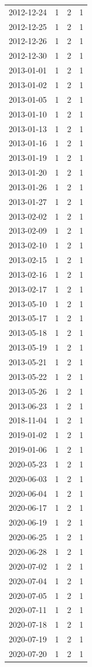\begin{tabular}{lrrr}
2012-12-24 & 1 & 2 & 1 \\
2012-12-25 & 1 & 2 & 1 \\
2012-12-26 & 1 & 2 & 1 \\
2012-12-30 & 1 & 2 & 1 \\
2013-01-01 & 1 & 2 & 1 \\
2013-01-02 & 1 & 2 & 1 \\
2013-01-05 & 1 & 2 & 1 \\
2013-01-10 & 1 & 2 & 1 \\
2013-01-13 & 1 & 2 & 1 \\
2013-01-16 & 1 & 2 & 1 \\
2013-01-19 & 1 & 2 & 1 \\
2013-01-20 & 1 & 2 & 1 \\
2013-01-26 & 1 & 2 & 1 \\
2013-01-27 & 1 & 2 & 1 \\
2013-02-02 & 1 & 2 & 1 \\
2013-02-09 & 1 & 2 & 1 \\
2013-02-10 & 1 & 2 & 1 \\
2013-02-15 & 1 & 2 & 1 \\
2013-02-16 & 1 & 2 & 1 \\
2013-02-17 & 1 & 2 & 1 \\
2013-05-10 & 1 & 2 & 1 \\
2013-05-17 & 1 & 2 & 1 \\
2013-05-18 & 1 & 2 & 1 \\
2013-05-19 & 1 & 2 & 1 \\
2013-05-21 & 1 & 2 & 1 \\
2013-05-22 & 1 & 2 & 1 \\
2013-05-26 & 1 & 2 & 1 \\
2013-06-23 & 1 & 2 & 1 \\
2018-11-04 & 1 & 2 & 1 \\
2019-01-02 & 1 & 2 & 1 \\
2019-01-06 & 1 & 2 & 1 \\
2020-05-23 & 1 & 2 & 1 \\
2020-06-03 & 1 & 2 & 1 \\
2020-06-04 & 1 & 2 & 1 \\
2020-06-17 & 1 & 2 & 1 \\
2020-06-19 & 1 & 2 & 1 \\
2020-06-25 & 1 & 2 & 1 \\
2020-06-28 & 1 & 2 & 1 \\
2020-07-02 & 1 & 2 & 1 \\
2020-07-04 & 1 & 2 & 1 \\
2020-07-05 & 1 & 2 & 1 \\
2020-07-11 & 1 & 2 & 1 \\
2020-07-18 & 1 & 2 & 1 \\
2020-07-19 & 1 & 2 & 1 \\
2020-07-20 & 1 & 2 & 1 \\
\bottomrule
\end{tabular}
